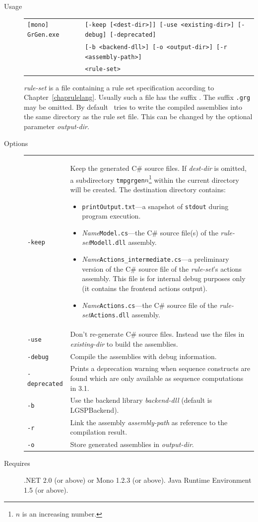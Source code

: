 \begin{description}
  \item[Usage] \begin{tabular*}{\linewidth}{@{}l@{}l}\texttt{[mono] GrGen.exe } & \texttt{[-keep [<dest-dir>]] [-use <existing-dir>] [-debug] [-deprecated]}\\
        &\texttt{[-b <backend-dll>] [-o <output-dir>] [-r <assembly-path>]}\\
        &\texttt{<rule-set>}\end{tabular*}
    \emph{rule-set} is a file containing a rule set specification according to Chapter~\ref{chaprulelang}. Usually such a file has the suffix \texttt{}. The suffix \texttt{.grg} may be omitted.
By default \GrG\ tries to write the compiled assemblies into the same directory as the rule set file. This can be changed by the optional parameter \emph{output-dir}.
  \item[Options] \mbox{}
    \begin{tabularx}{\linewidth}{lX}
      \texttt{-keep} & Keep the generated C\# source files. If \emph{dest-dir} is omitted, a subdirectory \texttt{tmpgrgen$n$}\footnote{$n$ is an increasing number.} within the current directory will be created. The destination directory contains:
\begin{itemize}
  \item \texttt{printOutput.txt}---a snapshot of \texttt{stdout} during program execution.
  \item \emph{Name}\texttt{Model.cs}---the C\# source file(s) of the \emph{rule-set}\texttt{Modell.dll} assembly.
  \item \emph{Name}\texttt{Actions\_intermediate.cs}---a preliminary version of the C\# source file of the \emph{rule-set}'s actions assembly.
	This file is for internal debug purposes only (it contains the frontend actions output).
  \item \emph{Name}\texttt{Actions.cs}---the C\# source file of the \emph{rule-set}\texttt{Actions.dll} assembly.
\end{itemize}\\
      \texttt{-use} & Don't re-generate C\# source files. Instead use the files in \emph{existing-dir} to build the assemblies.\\
      \texttt{-debug} & Compile the assemblies with debug information.\\
      \texttt{-deprecated} & Prints a deprecation warning when sequence constructs are found which are only available as sequence computations in 3.1.\\
      \texttt{-b} & Use the backend library \emph{backend-dll} (default is LGSPBackend).\\
      \texttt{-r} & Link the assembly \emph{assembly-path} as reference to the compilation result.\\
      \texttt{-o} & Store generated assemblies in \emph{output-dir}.
    \end{tabularx}
  \item[Requires] .NET 2.0 (or above) or Mono 1.2.3 (or above). Java Runtime Environment 1.5 (or above).
\end{description}


